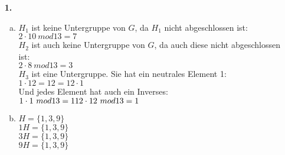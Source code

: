 \documentclass[a4paper]{scrartcl}
\title{\titleinfo}
\author{Elena Noll, Sven-Hendrik Haase, Arne Feil}
\date{\today}
\begin{document}
\maketitle

\begin{enumerate}
\item[\textbf{1.}]
\begin{enumerate}[a)]
\item
$H_1$ ist keine Untergruppe von $G$, da $H_1$ nicht abgeschlossen ist:\\
$2\cdot 10~mod 13 = 7$\\
$H_2$ ist auch keine Untergruppe von $G$, da auch diese nicht abgeschlossen ist:\\
$2\cdot 8~mod 13 = 3$\\
$H_3$ ist eine Untergruppe. Sie hat ein neutrales Element 1:\\
$1\cdot 12 = 12 = 12 \cdot 1$\\
Und jedes Element hat auch ein Inverses:\\
$1\cdot 1~mod 13 = 1\\
12\cdot 12~mod 13 = 1$
\item 
$H = \{1{,}3{,}9\}$\\
$1H = \{1{,}3{,}9\}$\\
$3H = \{1{,}3{,}9\}$\\
$9H = \{1{,}3{,}9\}$

\end{enumerate}
\end{enumerate}
\end{document}
